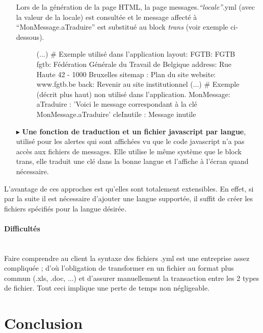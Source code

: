\documentclass{article}
\begin{document}
\begin{sffamily}
\begin{itemize}
Lors de la génération de la page HTML, la page messages.\textit{``locale''}.yml (avec la valeur de la locale) est consultée et le message affecté à ``MonMessage.aTraduire'' 
est substitué au block \textit{trans} (voir exemple ci-dessous).
\begin{figure}[h!]
\begin{center}
\begin{boxedverbatim}
(...)
# Exemple utilisé dans l'application
layout:
    FGTB: FGTB
    fgtb: Fédération Générale du Travail de Belgique
    address: Rue Haute 42 - 1000 Bruxelles
    sitemap : Plan du site
    website: www.fgtb.be
    back: Revenir au site institutionnel
(...)
# Exemple (décrit plus haut) non utilisé dans l'application.
MonMessage:
    aTraduire : 'Voici le message correspondant à la clé MonMessage.aTraduire'
    cleInutile : Message inutile
\end{boxedverbatim}
\end{center}
\end{figure}

\item[$\blacktriangleright$] \textbf{Une fonction de traduction et un fichier javascript par langue}, utilisé pour les alertes qui sont affichées vu que le code javascript 
n'a pas accès aux fichiers de messages. Elle utilise le même système que le block trans, elle traduit une clé dans la bonne langue et l'affiche à l'écran 
quand nécessaire.\\
\end{itemize}

L'avantage de ces approches est qu'elles sont totalement extensibles. En effet, si par la suite il est nécessaire d'ajouter une langue supportée, il suffit de créer les 
fichiers spécifiés pour la langue désirée.

\paragraph{Difficultés}$ $\\

Faire comprendre au client la syntaxe des fichiers .yml est une entreprise assez compliquée ; d'où l'obligation de transformer en un fichier au format plus commun (.xls, 
.doc, ...) et d'assurer manuellement la transaction entre les 2 types de fichier. Tout ceci implique une perte de temps non négligeable.

\newpage

\section{Conclusion}


\end{sffamily}
\end{document}
